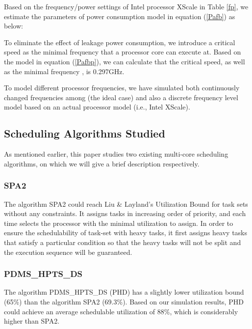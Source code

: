 \documentclass[12pt, journal,compsoc]{IEEEtran}
\begin{document}
Based on the frequency/power settings of Intel processor XScale\cite{Xu:2004:PPE:1017753.1017767} in Table \ref{fp}, we estimate the parameters of power consumption model in equation (\ref{Pafb}) as below:



To eliminate the effect of leakage power consumption, we introduce a critical speed \cite{Chen:2007:PDP:1326073.1326132} as the minimal frequency that a processor core can execute at. Based on the model in equation (\ref{Pafbp}), we can calculate that the critical speed, as well as the minimal frequency , is 0.297GHz.



To model different processor frequencies, we have simulated both continuously changed frequencies among  (the ideal case) and also a discrete frequency level model based on an actual processor model (i.e., Intel XScale).

\subsection{Scheduling Algorithms Studied}

As mentioned earlier, this paper studies two existing multi-core scheduling algorithms, on which we will give a brief description respectively.

\subsubsection{SPA2}

The algorithm SPA2 \cite{Guan:2010:FMS:1828428.1829220} could reach Liu \& Layland's Utilization Bound \cite{Liu:1973:SAM:321738.321743} for task sets without any constraints. It assigns tasks in increasing order of priority, and each time selects the processor with the minimal utilization to assign. In order to ensure the schedulability of task-set with heavy tasks, it first assigns heavy tasks that satisfy a particular condition so that the heavy tasks will not be split and the execution sequence will be guaranteed.

\subsubsection{PDMS\_HPTS\_DS}
The algorithm PDMS\_HPTS\_DS (PHD) \cite{Lakshmanan:2009:PFP:1581378.1581523} has a slightly lower utilization bound (65\%) than the algorithm SPA2 (69.3\%). Based on our simulation results, PHD could achieve an average schedulable utilization of 88\%, which is considerably higher than SPA2.
\end{document}
